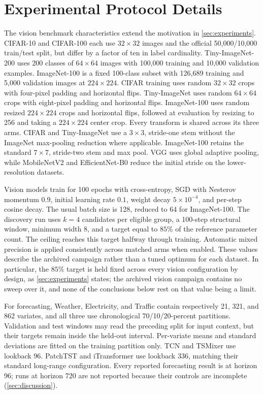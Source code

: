 \documentclass[10pt]{article}
\theoremstyle{paper}
\begin{document}
\section{Experimental Protocol Details}
\label{app:experiments}
The vision benchmark characteristics extend the motivation in \cref{sec:experiments}. CIFAR-10 and CIFAR-100 each use $32\times32$ images and the official 50,000/10,000 train/test split, but differ by a factor of ten in label cardinality. Tiny-ImageNet-200 uses 200 classes of $64\times64$ images with 100,000 training and 10,000 validation examples. ImageNet-100 is a fixed 100-class subset with 126,689 training and 5,000 validation images at $224\times224$. CIFAR training uses random $32\times32$ crops with four-pixel padding and horizontal flips. Tiny-ImageNet uses random $64\times64$ crops with eight-pixel padding and horizontal flips. ImageNet-100 uses random resized $224\times224$ crops and horizontal flips, followed at evaluation by resizing to 256 and taking a $224\times224$ center crop. Every transform is shared across its three arms. CIFAR and Tiny-ImageNet use a $3\times3$, stride-one stem without the ImageNet max-pooling reduction where applicable. ImageNet-100 retains the standard $7\times7$, stride-two stem and max pool. VGG uses global adaptive pooling, while MobileNetV2 and EfficientNet-B0 reduce the initial stride on the lower-resolution datasets.

Vision models train for 100 epochs with cross-entropy, SGD with Nesterov momentum $0.9$, initial learning rate $0.1$, weight decay $5\times10^{-4}$, and per-step cosine decay. The usual batch size is 128, reduced to 64 for ImageNet-100. The discovery run uses $k=4$ candidates per eligible group, a 100-step structural window, minimum width 8, and a target equal to $85\%$ of the reference parameter count. The ceiling reaches this target halfway through training. Automatic mixed precision is applied consistently across matched arms when enabled. These values describe the archived campaign rather than a tuned optimum for each dataset. In particular, the $85\%$ target is held fixed across every vision configuration by design, as \cref{sec:experiments} states; the archived vision campaign contains no sweep over it, and none of the conclusions below rest on that value being a limit.

For forecasting, Weather, Electricity, and Traffic \citep{lai2018modeling,zhou2021informer} contain respectively 21, 321, and 862 variates, and all three use chronological 70/10/20-percent partitions. Validation and test windows may read the preceding split for input context, but their targets remain inside the held-out interval. Per-variate means and standard deviations are fitted on the training partition only. TCN and TSMixer use lookback 96. PatchTST and iTransformer use lookback 336, matching their standard long-range configuration. Every reported forecasting result is at horizon 96; runs at horizon 720 are not reported because their controls are incomplete (\cref{sec:discussion}).
\end{document}
